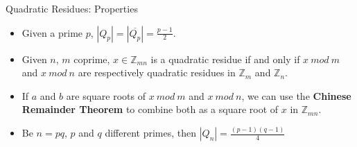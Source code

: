\documentclass{beamer}
\begin{document}



\begin{frame}{Quadratic Residues: Properties}
\begin{itemize}
	\item Given a prime $p$, $|Q_p| = |\overline{Q_p}| = \frac{p-1}{2}$.
	\item Given $n$, $m$ coprime,  $x \in {\mathbb Z}_{mn}$ is a quadratic residue if and only if $x~mod~m$ and  $x~mod~n$ are respectively quadratic residues in ${\mathbb Z}_m$ and ${\mathbb Z}_n$.
	\item If $a$ and $b$ are square roots of $x~mod~m$ and $x~mod~n$, we can use the \textbf{Chinese Remainder Theorem} to combine both as a square root of $x$ in ${\mathbb Z}_{mn}$.
	\item Be $n = pq$, $p$ and $q$ different primes, then $|Q_n| = \frac{(p-1)(q-1)}{4}$
\end{itemize}
\end{frame}
\end{document}
